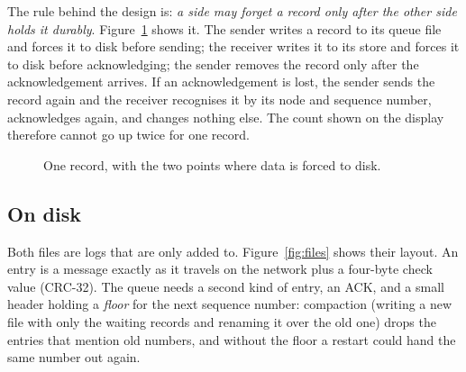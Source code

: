 \documentclass[11pt,a4paper]{article}
\newcommand{\prog}[1]{\texttt{#1}}
\newcommand{\msg}[1]{\textsc{#1}}
\begin{document}
The rule behind the design is: \emph{a side may forget a record only after the other side holds
it durably}. Figure~\ref{fig:journey} shows it. The sender writes a record to its queue file and
forces it to disk before sending; the receiver writes it to its store and forces it to disk
before acknowledging; the sender removes the record only after the acknowledgement arrives. If an
acknowledgement is lost, the sender sends the record again and the receiver recognises it by its
node and sequence number, acknowledges again, and changes nothing else. The count shown on the
display therefore cannot go up twice for one record.

\begin{figure}[!tbp]
\centering
{}
\caption{One record, with the two points where data is forced to disk.}
\label{fig:journey}
\end{figure}

\subsection{On disk}

Both files are logs that are only added to. Figure~\ref{fig:files} shows their layout. An entry is
a message exactly as it travels on the network plus a four-byte check value (CRC-32). The queue
needs a second kind of entry, an ACK, and a small header holding a \emph{floor} for the next
sequence number: compaction (writing a new file with only the waiting records and renaming it over
the old one) drops the entries that mention old numbers, and without the floor a restart could
hand the same number out again.
\end{document}
